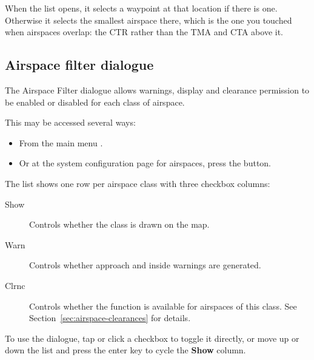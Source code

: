 When the list opens, it selects a waypoint at that location if there
is one.  Otherwise it selects the smallest airspace there, which is the
one you touched when airspaces overlap: the CTR rather than the TMA
and CTA above it.



\subsection*{Airspace filter dialogue}\label{sec:airspace-filter}

The Airspace Filter dialogue allows warnings, display and clearance
permission to be enabled or disabled for each class of airspace.

This may be accessed several ways:
\begin{itemize}
\item From the main menu \blink{}.
\item Or at the system configuration page for airspaces, press the  button.
\end{itemize}

The list shows one row per airspace class with three checkbox columns:
\begin{description}
\item[Show]  Controls whether the class is drawn on the map.
\item[Warn]  Controls whether approach and inside warnings are generated.
\item[Clrnc] Controls whether the  function is
  available for airspaces of this class.  See
  Section~\ref{sec:airspace-clearances} for details.
\end{description}
To use the dialogue, tap or click a checkbox to toggle it directly, or
move up or down the list and press the enter key to cycle the
\textbf{Show} column.

